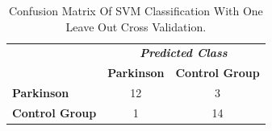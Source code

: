 \documentclass[10pt, conference, compsocconf]{IEEEtran}
\begin{document}

\begin{table}[!htbp]
\caption{Confusion Matrix Of SVM Classification With One Leave Out Cross Validation.}
\label{table:resultadomatrizconfusaosvm}
\centering
\begin{tabular}{l|c|c|}
\cline{2-3}
\multicolumn{1}{c}{}                         & \multicolumn{2}{|c|}{\textit{\textbf{Predicted Class}}} \\ \cline{2-3} 
                                             & \textbf{Parkinson}      & \textbf{Control Group}         \\ \hline
\multicolumn{1}{|l|}{\textbf{Parkinson}} & 12       & 3          \\ \hline
\multicolumn{1}{|l|}{\textbf{Control Group}}     & 1           & 14     \\ \hline
\end{tabular}
\end{table}


\end{document}
